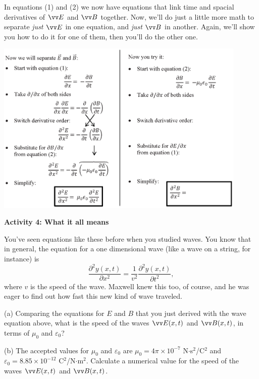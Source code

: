 In equations (1) and (2) we now have equations that link time and spacial derivatives of $\vv E$ and $\vv B$ together.  Now, we'll do just a little more math to separate \textit{just} $\vv E$ in one equation, and \textit{just} $\vv B$ in another.  Again, we'll show you how to do it for one of them, then you'll do the other one.
\vspace{-0.2in}

\begin{center}
    \includegraphics[width=0.9\textwidth]{deriving_em_waves/separate_E_and_B.eps} 
 \end{center}
\vspace{-0.2in}

\textbf{Activity 4: What it all means}

You've seen equations like these before when you studied waves.  You know that in general, the equation for a one dimensional wave (like a wave on a string, for instance) is
\begin{displaymath}
\frac{\partial^2y(x,t)}{\partial x^2}= \frac{1}{v^2} \frac{\partial^2y(x,t)}{\partial t^2},
\end{displaymath}
where $v$ is the speed of the wave.  Maxwell knew this too, of course, and he was eager to find out how fast this new kind of wave traveled.

(a) Comparing the equations for $E$ and $B$ that you just derived with the wave equation above, what is the speed of the waves $\vv E(x,t)$ and $\vv B(x,t)$, in terms of $\mu_0$ and $\varepsilon_0$?
\vspace{0.5in}

(b)  The accepted values for $\mu_0$ and $\varepsilon_0$ are $\mu_0=4\pi \times 10^{-7}$ N$\cdot$s$^2$/C$^2$ and 
$\varepsilon_0=8.85 \times 10^{-12}$ C$^2$/N$\cdot $m$^2$.  Calculate a numerical value for the speed of the waves 
$\vv E(x,t)$ and $\vv B(x,t)$.
\vspace{0.5in}

